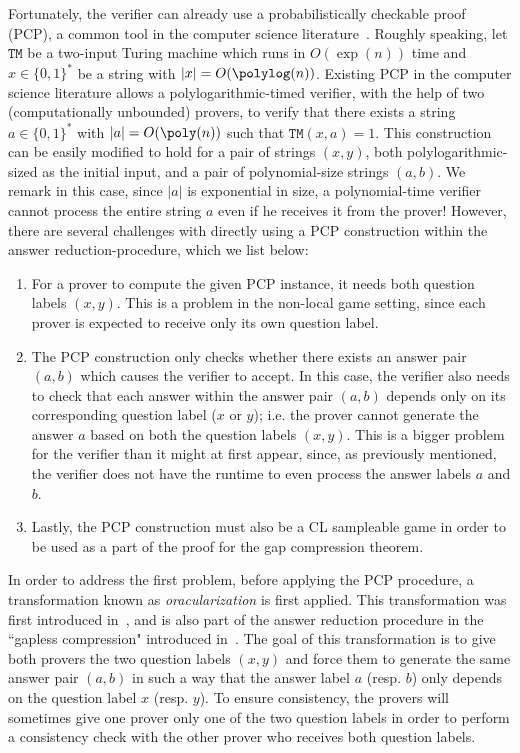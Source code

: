 Fortunately, the verifier can already use a probabilistically checkable proof (PCP), a common tool in the computer science literature~\cite{aroraProofVerificationHardness1998}. Roughly speaking, let $\texttt{TM}$ be a two-input Turing machine which runs in $O(\exp(n))$ time and $x \in \{0,1\}^*$ be a string with $|x| = O(\polylog(n))$. Existing PCP in the computer science literature allows a polylogarithmic-timed verifier, with the help of two (computationally unbounded) provers, to verify that there exists a string $a \in \{0,1\}^*$ with $|a| = O(\poly(n))$ such that $\texttt{TM}(x,a) = 1$. This construction can be easily modified to hold for a pair of strings $(x,y)$, both polylogarithmic-sized as the initial input, and a pair of polynomial-size strings $(a,b)$. We remark in this case, since $|a|$ is exponential in size, a polynomial-time verifier cannot process the entire string $a$ even if he receives it from the prover! However, there are several challenges with directly using a PCP construction within the answer reduction-procedure, which we list below: 
\begin{enumerate}
	\item For a prover to compute the given PCP instance, it needs both question labels $(x,y)$. This is a problem in the non-local game setting, since each prover is expected to receive only its own question label. 
	\item The PCP construction only checks whether there exists an answer pair $(a,b)$ which causes the verifier to accept. In this case, the verifier also needs to check that each answer within the answer pair $(a,b)$ depends only on its corresponding question label ($x$ or $y$); i.e. the prover cannot generate the answer $a$ based on both the question labels $(x,y)$. This is a bigger problem for the verifier than it might at first appear, since, as previously mentioned, the verifier does not have the runtime to even process the answer labels $a$ and $b$. 
	\item Lastly, the PCP construction must also be a CL sampleable game in order to be used as a part of the proof for the gap compression theorem. 
\end{enumerate} 

In order to address the first problem, before applying the PCP procedure, a transformation known as \emph{oracularization} is first applied. This transformation was first introduced in~\cite[Section 9]{jiMIPRE2022a}, and is also part of the answer reduction procedure in the ``gapless compression" introduced in~\cite{mousaviNonlocalGamesCompression2022}. The goal of this transformation is to give both provers the two question labels $(x,y)$ and force them to generate the same answer pair $(a,b)$ in such a way that the answer label $a$ (resp. $b$) only depends on the question label $x$ (resp. $y$). To ensure consistency, the provers will sometimes give one prover only one of the two question labels in order to perform a consistency check with the other prover who receives both question labels. 

